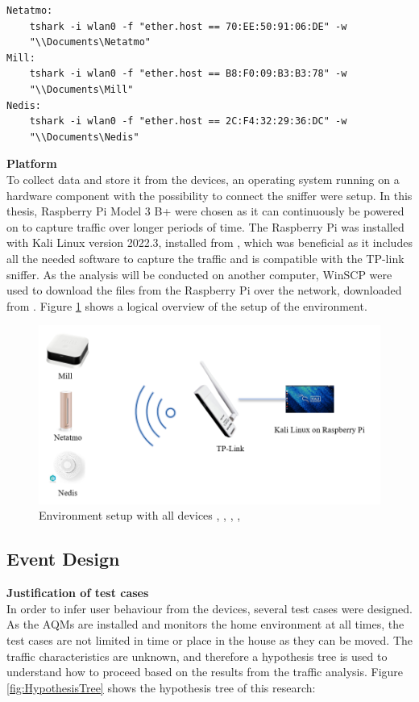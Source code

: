 \begin{verbatim}
Netatmo:
    tshark -i wlan0 -f "ether.host == 70:EE:50:91:06:DE" -w 
    "\\Documents\Netatmo"
Mill:
    tshark -i wlan0 -f "ether.host == B8:F0:09:B3:B3:78" -w 
    "\\Documents\Mill"
Nedis:
    tshark -i wlan0 -f "ether.host == 2C:F4:32:29:36:DC" -w 
    "\\Documents\Nedis"
\end{verbatim}

\noindent
\textbf{Platform}\\
To collect data and store it from the devices, an operating system running on a hardware component with the possibility to connect the sniffer were setup. In this thesis, Raspberry Pi Model 3 B+ were chosen as it can continuously be powered on to capture traffic over longer periods of time. The Raspberry Pi was installed with Kali Linux version 2022.3, installed from \cite{KaliLinux}, which was beneficial as it includes all the needed software to capture the traffic and is compatible with the TP-link sniffer. As the analysis will be conducted on another computer, WinSCP were used to download the files from the Raspberry Pi over the network, downloaded from \cite{WinSCP}. Figure \ref{fig:Environment} shows a logical overview of the setup of the environment.  

\begin{figure} [H]
    \centering
    \includegraphics[width=1\textwidth]{figures/Environment.png}
    \caption{Environment setup with all devices \cite{MillSense}, \cite{NetatmoDevice}, \cite{NedisDevice}, \cite{Sniffer}, \cite{KaliLinux}}
    \label{fig:Environment}
\end{figure}

\subsection{Event Design}
\textbf{Justification of test cases}\\
In order to infer user behaviour from the devices, several test cases were designed. As the \gls{AQM}s are installed and monitors the home environment at all times, the test cases are not limited in time or place in the house as they can be moved. The traffic characteristics are unknown, and therefore a hypothesis tree is used to understand how to proceed based on the results from the traffic analysis. Figure \ref{fig:HypothesisTree} shows the hypothesis tree of this research:

